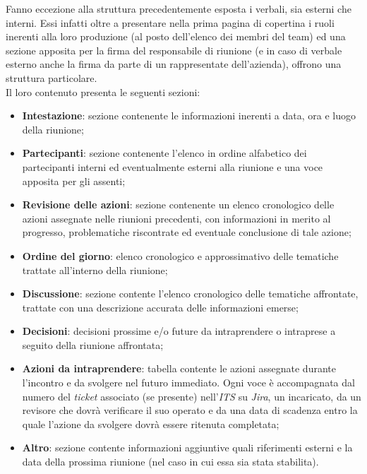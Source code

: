 \documentclass[10pt, a4paper]{article}
\begin{document}
    Fanno eccezione alla struttura precedentemente esposta i verbali, sia esterni che interni. Essi infatti oltre a 
    presentare nella prima pagina di copertina i ruoli inerenti alla loro produzione (al posto dell'elenco dei membri del team) ed una 
    sezione apposita per la firma del responsabile di riunione (e in caso di verbale esterno anche la firma da parte di un rappresentate 
    dell'azienda), offrono una struttura particolare.\\
    Il loro contenuto presenta le seguenti sezioni:
    \begin{itemize}
        \item \textbf{Intestazione}: sezione contenente le informazioni inerenti a data, ora e luogo della riunione;
        \item \textbf{Partecipanti}: sezione contenente l'elenco in ordine alfabetico dei partecipanti interni ed eventualmente esterni 
        alla riunione e una voce apposita per gli assenti;
        \item \textbf{Revisione delle azioni}: sezione contenente un elenco cronologico delle azioni assegnate nelle riunioni precedenti, 
        con informazioni in merito al progresso, problematiche riscontrate ed eventuale conclusione di tale azione;
        \item \textbf{Ordine del giorno}: elenco cronologico e approssimativo delle tematiche trattate all'interno della riunione;
        \item \textbf{Discussione}: sezione contente l'elenco cronologico delle tematiche affrontate, trattate con una descrizione accurata 
        delle informazioni emerse;
        \item \textbf{Decisioni}: decisioni prossime e/o future da intraprendere o intraprese a seguito della riunione affrontata;
        \item \textbf{Azioni da intraprendere}: tabella contente le azioni assegnate durante l'incontro e da svolgere nel futuro immediato. 
        Ogni voce è accompagnata dal numero del \textit{ticket} associato (se presente) nell'\textit{ITS\pg} su \textit{Jira\pg}, un incaricato, da un 
        revisore che dovrà verificare il suo operato e da una data di scadenza entro la quale l'azione da svolgere dovrà essere ritenuta 
        completata;
        \item \textbf{Altro}: sezione contente informazioni aggiuntive quali riferimenti esterni e la data della prossima riunione 
        (nel caso in cui essa sia stata stabilita).
    \end{itemize}    
    
\end{document}
